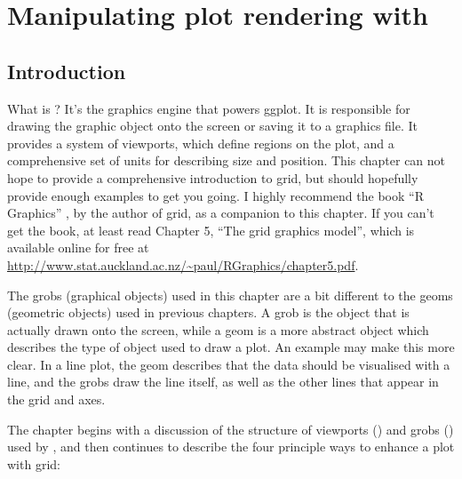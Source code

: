 

\chapter{Manipulating plot rendering with }
\label{cha:grid}

\section{Introduction}



What is ?  It's the graphics engine that powers ggplot.  It is responsible for drawing the graphic object onto the screen or saving it to a graphics file.  It provides a system of viewports, which define regions on the plot, and a comprehensive set of units for describing size and position. This chapter can not hope to provide a comprehensive introduction to grid, but should hopefully provide enough examples to get you going.   I highly recommend the book ``R Graphics'' \citep{murrell:2005}, by the author of grid,  as a companion to this chapter.  If you can't get the book, at least read Chapter 5, ``The grid graphics model'', which is available online for free at  \url{http://www.stat.auckland.ac.nz/~paul/RGraphics/chapter5.pdf}.

The grobs (graphical objects) used in this chapter are a bit different to the geoms (geometric objects) used in previous chapters.  A grob is the object that is actually drawn onto the screen, while a geom is a more abstract object which describes the type of object used to draw a plot.  An example may make this more clear. In a line plot, the geom describes that the data should be visualised with a line, and the grobs draw the line itself, as well as the other lines that appear in the grid and axes.

The chapter begins with a discussion of the structure of viewports () and grobs () used by \ggplot, and then continues to describe the four principle ways to enhance a plot with grid:

